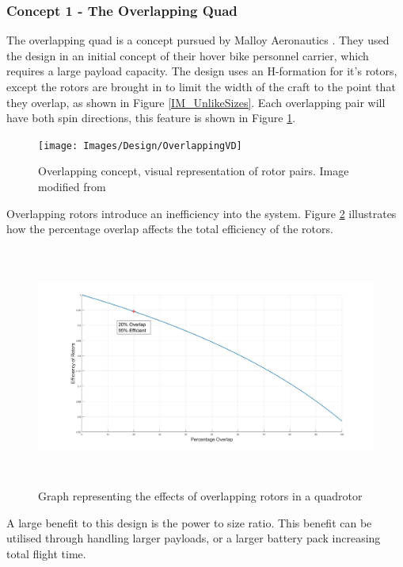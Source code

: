			\subsubsection{Concept 1 - The Overlapping Quad}
			The overlapping quad is a concept pursued by Malloy Aeronautics \cite{MAHover}. They used the design in an initial concept of their hover bike personnel carrier, which requires a large payload capacity. The design uses an H-formation for it's rotors, except the rotors are brought in to limit the width of the craft to the point that they overlap, as shown in Figure \ref{IM_UnlikeSizes}. Each overlapping pair will have both spin directions, this feature is shown in Figure \ref{IM_OverlappingPair}.
		
			\begin{figure}[H]
			\centering
			\texttt{[image: Images/Design/OverlappingVD]}
			\caption{Overlapping concept, visual representation of rotor pairs. Image modified from \cite{MAHover}}
			\label{IM_OverlappingPair}
			\end{figure}
			
			Overlapping rotors introduce an inefficiency into the system. Figure \ref{IM_SeperationGraph} illustrates how the percentage overlap affects the total efficiency of the rotors.
			
			\begin{figure}[H]
			\centering
			\includegraphics[height = 7.9cm]{Images/RotorOverlap.jpg}
			\caption{Graph representing the effects of overlapping rotors in a quadrotor}
			\label{IM_SeperationGraph}
			\end{figure}
			
			A large benefit to this design is the power to size ratio. This benefit can be utilised through handling larger payloads, or a larger battery pack increasing total flight time.

